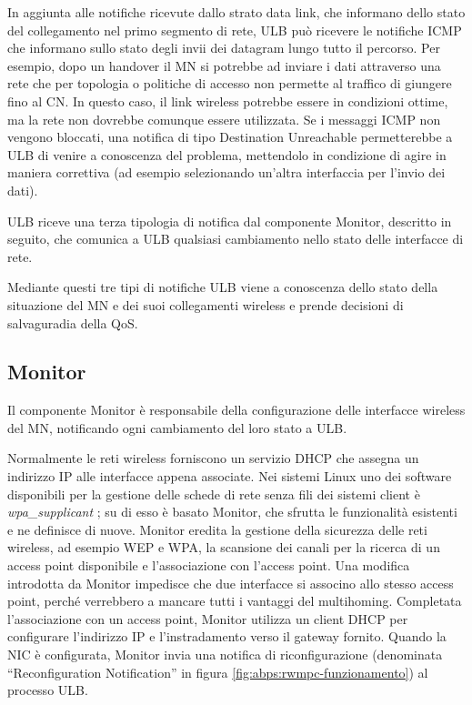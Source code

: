 \documentclass[12pt,a4paper,openright,twoside]{book}
\begin{document}
In aggiunta alle notifiche ricevute dallo strato data link, che
informano dello stato del collegamento nel primo segmento di rete, ULB
può ricevere le notifiche ICMP che informano sullo stato degli invii
dei datagram lungo tutto il percorso. Per esempio, dopo un handover il
MN si potrebbe ad inviare i dati attraverso una rete che per topologia
o politiche di accesso non permette al traffico di giungere fino al
CN. In questo caso, il link wireless potrebbe essere in condizioni
ottime, ma la rete non dovrebbe comunque essere utilizzata. Se i
messaggi ICMP non vengono bloccati, una notifica di tipo Destination
Unreachable permetterebbe a ULB di venire a conoscenza del problema,
mettendolo in condizione di agire in maniera correttiva (ad esempio
selezionando un'altra interfaccia per l'invio dei dati).

ULB riceve una terza tipologia di notifica dal componente Monitor,
descritto in seguito, che comunica a ULB qualsiasi cambiamento nello
stato delle interfacce di rete.

Mediante questi tre tipi di notifiche ULB viene a conoscenza dello
stato della situazione del MN e dei suoi collegamenti wireless e
prende decisioni di salvaguradia della QoS.

\subsection{Monitor}

Il componente Monitor è responsabile della configurazione delle
interfacce wireless del MN, notificando ogni cambiamento del loro
stato a ULB.

Normalmente le reti wireless forniscono un servizio DHCP che assegna
un indirizzo IP alle interfacce appena associate. Nei sistemi Linux
uno dei software disponibili per la gestione delle schede di rete
senza fili dei sistemi client è \emph{wpa\_supplicant}
\cite{bib:wpa_supplicant}; su di esso è basato Monitor, che sfrutta le
funzionalità esistenti e ne definisce di nuove. Monitor eredita la
gestione della sicurezza delle reti wireless, ad esempio WEP e WPA, la
scansione dei canali per la ricerca di un access point disponibile e
l'associazione con l'access point. Una modifica introdotta da Monitor
impedisce che due interfacce si associno allo stesso access point,
perché verrebbero a mancare tutti i vantaggi del
multihoming. Completata l'associazione con un access point, Monitor
utilizza un client DHCP per configurare l'indirizzo IP e
l'instradamento verso il gateway fornito. Quando la NIC è configurata,
Monitor invia una notifica di riconfigurazione (denominata
``Reconfiguration Notification'' in figura
\ref{fig:abps:rwmpc-funzionamento}) al processo ULB.
\end{document}
